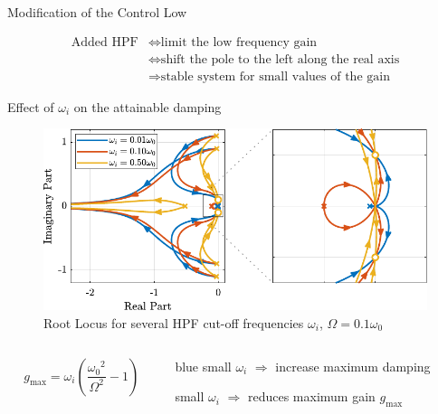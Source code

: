 \documentclass[t, minted]{clean-beamer}
\begin{document}
\begin{frame}[label={sec:orga459f5e}]{Modification of the Control Low}
\begin{minipage}[b]{0.5\linewidth}
\begin{center}
\end{center}
\end{minipage}

\vspace{-1em}

\begin{align*}
\text{Added HPF} &\Longleftrightarrow \text{limit the low frequency gain} \\
                 &\Longleftrightarrow \text{shift the pole to the left along the real axis} \\
                 &\Longrightarrow \text{stable system for small values of the gain}
\end{align*}
\end{frame}


\begin{frame}[label={sec:org4390eac}]{Effect of \(\omega_i\) on the attainable damping}
\begin{figure}[htbp]
\centering
\includegraphics[width=\linewidth]{figs/root_locus_wi_modified_iff.pdf}
\caption{Root Locus for several HPF cut-off frequencies \(\omega_i\), \(\Omega = 0.1 \omega_0\)}
\end{figure}

\vspace{-2em}

\begin{columns}
\begin{column}{0.3\columnwidth}
\begin{equation*}
  g_{\text{max}} = \omega_i \left( \frac{{\omega_0}^2}{\Omega^2} - 1 \right)
\end{equation*}
\end{column}

\begin{column}{0.7\columnwidth}
\begin{cbox}[]{blue}{}
small \(\omega_i\) \(\Longrightarrow\) increase maximum damping

small \(\omega_i\) \(\Longrightarrow\) reduces maximum gain \(g_\text{max}\)
\end{cbox}
\end{column}
\end{columns}
\end{frame}
\end{document}
